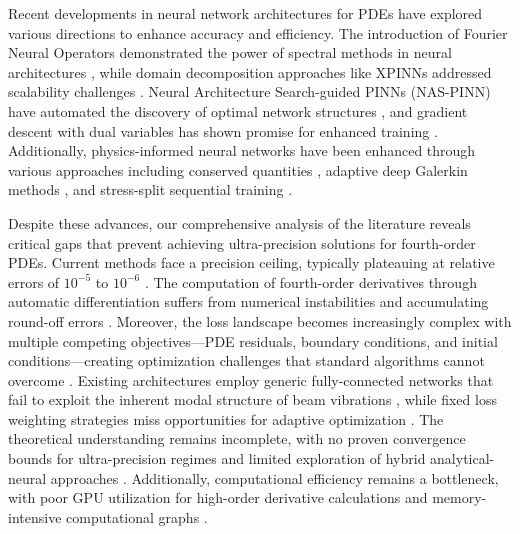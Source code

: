 Recent developments in neural network architectures for PDEs have explored various directions to enhance accuracy and efficiency. The introduction of Fourier Neural Operators demonstrated the power of spectral methods in neural architectures \cite{li2020fourier}, while domain decomposition approaches like XPINNs addressed scalability challenges \cite{jagtap2020extended,kharazmi2021hp}. Neural Architecture Search-guided PINNs (NAS-PINN) have automated the discovery of optimal network structures \cite{wang2024nas}, and gradient descent with dual variables has shown promise for enhanced training \cite{Jin2023DualGD}. Additionally, physics-informed neural networks have been enhanced through various approaches including conserved quantities \cite{lin2022two}, adaptive deep Galerkin methods \cite{lu2024adaptive}, and stress-split sequential training \cite{haghighat2022physics}.

Despite these advances, our comprehensive analysis of the literature reveals critical gaps that prevent achieving ultra-precision solutions for fourth-order PDEs. Current methods face a precision ceiling, typically plateauing at relative errors of $10^{-5}$ to $10^{-6}$ \cite{vahab2022physics,kapoor2023physics}. The computation of fourth-order derivatives through automatic differentiation suffers from numerical instabilities and accumulating round-off errors \cite{hu2024hutchinson}. Moreover, the loss landscape becomes increasingly complex with multiple competing objectives—PDE residuals, boundary conditions, and initial conditions—creating optimization challenges that standard algorithms cannot overcome \cite{wang2021understanding,krishnapriyan2021characterizing}. Existing architectures employ generic fully-connected networks that fail to exploit the inherent modal structure of beam vibrations \cite{brunton2024machine}, while fixed loss weighting strategies miss opportunities for adaptive optimization \cite{mcclenny2023self}. The theoretical understanding remains incomplete, with no proven convergence bounds for ultra-precision regimes and limited exploration of hybrid analytical-neural approaches \cite{arzani2023theory,cho2023separable}. Additionally, computational efficiency remains a bottleneck, with poor GPU utilization for high-order derivative calculations and memory-intensive computational graphs \cite{jagtap2020conservative}.

